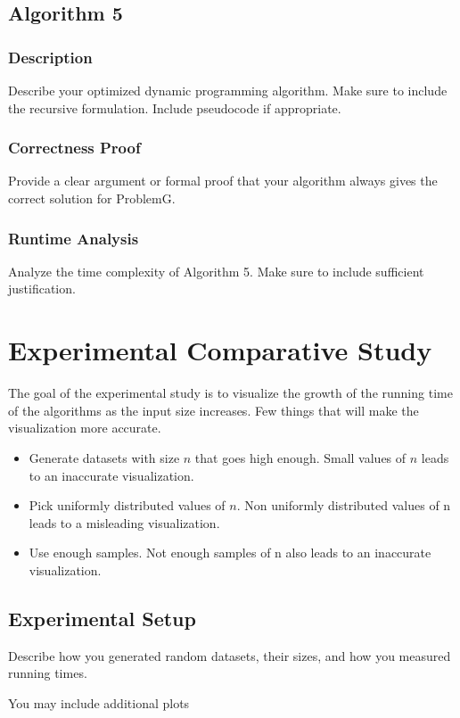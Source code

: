 \documentclass{article}
\begin{document}
\subsection{Algorithm 5}

\subsubsection{Description}
{\color{red} Describe your optimized dynamic programming algorithm. Make sure to include the recursive formulation. Include pseudocode if appropriate.}

\subsubsection{Correctness Proof}
{\color{red} Provide a clear argument or formal proof that your algorithm always gives the correct solution for ProblemG.}

\subsubsection{Runtime Analysis}
{\color{red} Analyze the time complexity of Algorithm 5. Make sure to include sufficient
justification.}

\section{Experimental Comparative Study}

{\color{red}The goal of the experimental study is to visualize the growth of the running time of the algorithms as the input size increases. Few things that will make the visualization more accurate.

\begin{itemize}
    \item Generate datasets with size $n$ that goes high enough. Small values of $n$ leads to an inaccurate visualization.
    \item Pick uniformly distributed values of $n$. Non uniformly distributed values of n leads to a misleading visualization.
    \item Use enough samples. Not enough samples of n also leads to an inaccurate visualization.
\end{itemize}
}

\subsection{Experimental Setup}
{\color{red} Describe how you generated random datasets, their sizes, and how you measured running times.

You may include additional plots


}
\end{document}
